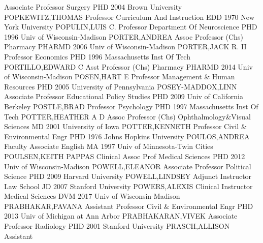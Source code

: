 \documentclass[
]{article}
\begin{document}
\textbar Associate Professor \textbar Surgery \textbar PHD 2004 Brown
University \textbar POPKEWITZ,THOMAS \textbar{} 
\textbar Professor \textbar Curriculum And Instruction \textbar EDD 1970
New York University \textbar POPULIN,LUIS C. \textbar{} 
\textbar Professor \textbar Department Of Neuroscience \textbar PHD 1996
Univ of Wisconsin-Madison \textbar PORTER,ANDREA \textbar{} 
\textbar Assoc Professor (Chs) \textbar Pharmacy \textbar PHARMD 2006
Univ of Wisconsin-Madison \textbar PORTER,JACK R. II \textbar{}
 \textbar Professor \textbar Economics \textbar PHD 1996
Massachusetts Inst Of Tech \textbar PORTILLO,EDWARD C \textbar{}
 \textbar Asst Professor (Chs) \textbar Pharmacy
\textbar PHARMD 2014 Univ of Wisconsin-Madison \textbar POSEN,HART E
\textbar{}  \textbar Professor \textbar Management \& Human
Resources \textbar PHD 2005 University of Pennsylvania
\textbar POSEY-MADDOX,LINN \textbar{}  \textbar Associate
Professor \textbar Educational Policy Studies \textbar PHD 2009 Univ of
California Berkeley \textbar POSTLE,BRAD \textbar{} 
\textbar Professor \textbar Psychology \textbar PHD 1997 Massachusetts
Inst Of Tech \textbar POTTER,HEATHER A D \textbar{} 
\textbar Assoc Professor (Chs) \textbar Ophthalmology\&Visual Sciences
\textbar MD 2001 University of Iowa \textbar POTTER,KENNETH \textbar{}
 \textbar Professor \textbar Civil \& Environmental Engr
\textbar PHD 1976 Johns Hopkins University \textbar POULOS,ANDREA
\textbar{}  \textbar Faculty Associate \textbar English
\textbar MA 1997 Univ of Minnesota-Twin Cities \textbar POULSEN,KEITH
PAPPAS \textbar{}  \textbar Clinical Assoc Prof
\textbar Medical Sciences \textbar PHD 2012 Univ of Wisconsin-Madison
\textbar POWELL,ELEANOR \textbar{}  \textbar Associate
Professor \textbar Political Science \textbar PHD 2009 Harvard
University \textbar POWELL,LINDSEY \textbar{} 
\textbar Adjunct Instructor \textbar Law School \textbar JD 2007
Stanford University \textbar POWERS,ALEXIS \textbar{} 
\textbar Clinical Instructor \textbar Medical Sciences \textbar DVM 2017
Univ of Wisconsin-Madison \textbar PRABHAKAR,PAVANA \textbar{}
 \textbar Assistant Professor \textbar Civil \&
Environmental Engr \textbar PHD 2013 Univ of Michigan at Ann Arbor
\textbar PRABHAKARAN,VIVEK \textbar{}  \textbar Associate
Professor \textbar Radiology \textbar PHD 2001 Stanford University
\textbar PRASCH,ALLISON \textbar{}  \textbar Assistant
\end{document}
